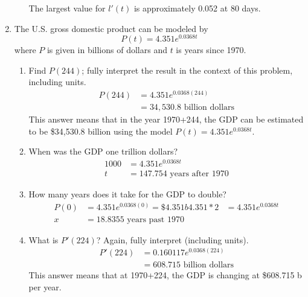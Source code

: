 \documentclass{article}
\begin{document}
\begin{enumerate}
\begin{enumerate}
\begin{center}
		\end{center}
		The largest value for $l'(t)$ is approximately 0.052 at 80 days.
	\end{enumerate}
	\item The U.S. gross domestic product can be modeled by $$P(t)=4.351e^{0.0368t}$$ where $P$ is given in billions of dollars and $t$ is years since 1970.
	 \begin{enumerate}
	 	\item Find $P(244)$; fully interpret the result in the context of this problem, including units.
	 	$$\begin{align}
	 		P(244)&=4.351e^{0.0368(244)}\\
	 		&= 34,530.8 \text{ billion dollars}
	 	\end{align}$$
	 	This answer means that in the year 1970+244, the GDP can be estimated to be \$34,530.8 billion using the model $P(t)=4.351e^{0.0368t}$.
	 	\item When was the GDP one trillion dollars?
	 	$$\begin{align}
	 		1000 &= 4.351e^{0.0368t}\\
	 		t&= 147.754 \text{ years after 1970}
	 	\end{align}$$
	 	\item How many years does it take for the GDP to double?
	 	$$\begin{align}
	 		P(0)&=4.351e^{0.0368(0)}=\$4.351b
	 		4.351 * 2 &= 4.351e^{0.0368t}\\
	 		x&= 18.8355\text{ years past 1970}
	 	\end{align}$$
	 	\item What is $P'(224)$? Again, fully interpret (including units).
	 	$$\begin{align}
	 		P'(224)&= 0.160117e^{0.0368(224)}\\
	 		&= 608.715 \text{ billion dollars}
	 	\end{align}$$
	 	This answer means that at 1970+224, the GDP is changing at \$608.715 b per year.
	 \end{enumerate}
\end{enumerate}
\end{document}
